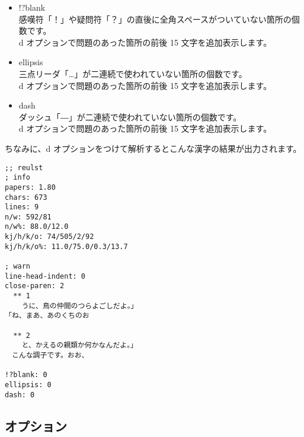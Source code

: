 \documentclass[a4j]{jsarticle}
\begin{document}
\begin{itemize}
  \item !?blank \\
    感嘆符「！」や疑問符「？」の直後に全角スペースがついていない箇所の個数です。 \\
    d オプションで問題のあった箇所の前後 15 文字を追加表示します。

  \item ellipsis \\
    三点リーダ「…」が二連続で使われていない箇所の個数です。 \\
    d オプションで問題のあった箇所の前後 15 文字を追加表示します。

  \item dash \\
    ダッシュ「―」が二連続で使われていない箇所の個数です。 \\
    d オプションで問題のあった箇所の前後 15 文字を追加表示します。

\end{itemize}

ちなみに、d オプションをつけて解析するとこんな漢字の結果が出力されます。

\begin{lstlisting}[caption=出力 (dオプション付き)]
;; reulst
; info
papers: 1.80
chars: 673
lines: 9
n/w: 592/81
n/w%: 88.0/12.0
kj/h/k/o: 74/505/2/92
kj/h/k/o%: 11.0/75.0/0.3/13.7

; warn
line-head-indent: 0
close-paren: 2
  ** 1
    うに、鳥の仲間のつらよごしだよ。」
「ね、まあ、あのくちのお

  ** 2
    と、かえるの親類か何かなんだよ。」
　こんな調子です。おお、

!?blank: 0
ellipsis: 0
dash: 0
\end{lstlisting}



\subsection{オプション}
\end{document}
